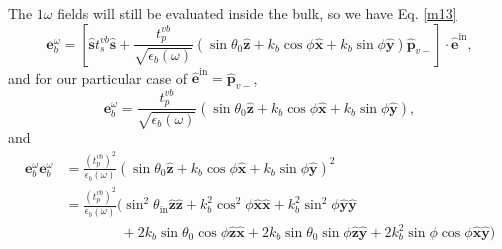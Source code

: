 The $1\omega$ fields will still be evaluated inside the bulk, so we have Eq.
\eqref{m13}
\begin{equation*}
\mathbf{e}^{\omega}_{b}
= \left[
\hat{\mathbf{s}}t_{s}^{vb}\hat{\mathbf{s}}
+ \frac{t^{vb}_{p}}{\sqrt{\epsilon_{b}(\omega)}}
\left(
  \sin\theta_{0}\hat{\mathbf{z}}
+ k_{b}\cos\phi\hat{\mathbf{x}}
+ k_{b}\sin\phi\hat{\mathbf{y}}
\right) 
\hat{\mathbf{p}}_{v-}
\right]
\cdot\hat{\mathbf{e}}^{\mathrm{in}},  
\end{equation*}
and for our particular case of
$\hat{\mathbf{e}}^{\mathrm{in}}=\hat{\mathbf{p}}_{v-}$,
\begin{equation*}
\mathbf{e}^{\omega}_{b}
= \frac{t^{vb}_{p}}{\sqrt{\epsilon_{b}(\omega)}}
\left(
  \sin\theta_{0}\hat{\mathbf{z}}
+ k_{b}\cos\phi\hat{\mathbf{x}}
+ k_{b}\sin\phi\hat{\mathbf{y}}
\right),
\end{equation*}
and
\begin{equation*}
\begin{split}
\mathbf{e}^{\omega}_{b}\mathbf{e}^{\omega}_{b}
&= \frac{\left(t^{vb}_{p}\right)^{2}}{\epsilon_{b}(\omega)}
\left(
  \sin\theta_{0}\hat{\mathbf{z}}
+ k_{b}\cos\phi\hat{\mathbf{x}}
+ k_{b}\sin\phi\hat{\mathbf{y}}
\right)^{2}\\
&= \frac{\left(t^{vb}_{p}\right)^{2}}{\epsilon_{b}(\omega)}
\big(
  \sin^{2}\theta_{\mathrm{in}}\hat{\mathbf{z}}\hat{\mathbf{z}}
+ k^{2}_{b}\cos^{2}\phi\hat{\mathbf{x}}\hat{\mathbf{x}}
+ k^{2}_{b}\sin^{2}\phi\hat{\mathbf{y}}\hat{\mathbf{y}}\\
&\qquad\qquad
+ 2k_{b}\sin\theta_{0}\cos\phi\hat{\mathbf{z}}\hat{\mathbf{x}}
+ 2k_{b}\sin\theta_{0}\sin\phi\hat{\mathbf{z}}\hat{\mathbf{y}}
+ 2k^{2}_{b}\sin\phi\cos\phi\hat{\mathbf{x}}\hat{\mathbf{y}}
\big)
\end{split}
\end{equation*}

